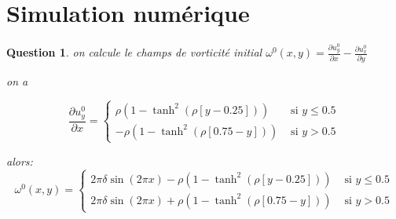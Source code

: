 \documentclass[a4paper,10pt]{article}
\newtheorem{question}{Question}
\begin{document}
\section{ Simulation numérique}
\begin{question}
on calcule le champs de vorticité initial  $ \omega^{0}(x,y) = \frac{\partial u_y^0}{\partial x} - \frac{\partial u_x^0}{\partial y}$


on a

$$ \frac{\partial u_y^0}{\partial x} =
\begin{cases}
\rho (1 - \tanh^2(\rho [y - 0.25])) &\text{ si }y\leq  0.5  \\
 - \rho (1 - \tanh^2(\rho [0.75 - y ])) &\text{ si }y > 0.5
\end{cases}
$$

alors:
$$ \omega^{0}(x,y) =
\begin{cases}
2\pi \delta \sin(2 \pi x) - \rho (1 - \tanh^2(\rho [y - 0.25]))  &\text{ si }y\leq  0.5  \\
2\pi \delta \sin(2 \pi x) + \rho (1 - \tanh^2(\rho [0.75 - y ])) &\text{ si }y > 0.5
\end{cases}
$$
\end{question}
\vskip 8cm
\end{document}
